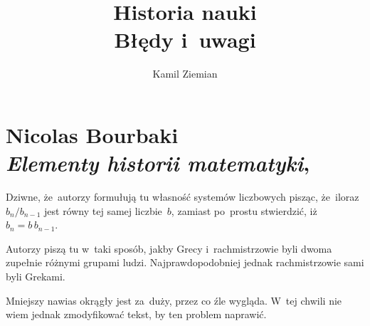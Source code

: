 \documentclass[a4paper,11pt]{article}
\title{Historia nauki \\
  {\Large Błędy i~uwagi}}
\author{Kamil Ziemian}
\numberwithin{equation}{section}
\begin{document}





\maketitle %





\section{ %
  Nicolas Bourbaki \\
  \textit{Elementy historii matematyki},
  \parencite{Bourbaki-Elementy-historii-matematyki-Pub-1980}}

\label{sec:Bourbaki-EHM}




\vspace{0em}


\noindent
{} Dziwne, że~autorzy formułują tu własność systemów
liczbowych pisząc, że~iloraz $b_{ n } / b_{ n - 1 }$ jest równy tej
samej liczbie~$b$, zamiast po~prostu stwierdzić,
iż~$b_{ n } = b \, b_{ n - 1 }$.

\VerSpaceFour





\noindent
{} Autorzy piszą tu w~taki sposób, jakby Grecy
i~rachmistrzowie byli dwoma zupełnie różnymi grupami ludzi.
Najprawdopodobniej jednak rachmistrzowie sami byli Grekami.

\VerSpaceFour





\noindent
{} Mniejszy nawias okrągły jest za~duży, przez co źle
wygląda. W~tej chwili nie wiem jednak zmodyfikować tekst, by ten problem
naprawić.





\newpage

\end{document}
